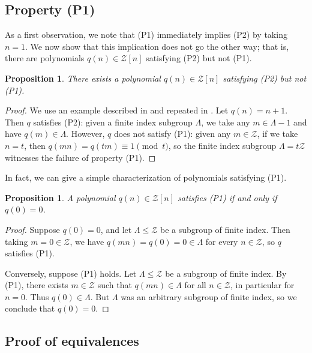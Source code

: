\documentclass[11pt]{amsart}
\theoremstyle{theorem}
\newtheorem{proposition}[theorem]{Proposition}
\theoremstyle{definition}
\newcommand{\mZ}{\mathcal{Z}}
\begin{document}
\subsection{Property (P1)}

As a first observation, we note that (P1) immediately implies (P2) by taking $n = 1$.
We now show that this implication does not go the other way; that is, there are polynomials $q(n) \in \mZ[n]$ satisfying (P2) but not (P1).

\begin{proposition} \label{prop: inequivalence}
	There exists a polynomial $q(n) \in \mZ[n]$ satisfying (P2) but not (P1).
\end{proposition}

\begin{proof}
	We use an example described in \cite[p. 3, footnote 3]{ab_fields} and repeated in \cite[Remark 4.15]{ab_rings}.
	Let $q(n) = n+1$.
	Then $q$ satisfies (P2): given a finite index subgroup $\Lambda$, we take any $m \in \Lambda - 1$ and have $q(m) \in \Lambda$.
	However, $q$ does not satisfy (P1): given any $m \in \mZ$, if we take $n = t$, then $q(mn) = q(tm) \equiv 1 \pmod{t}$, so the finite index subgroup $\Lambda = t\mZ$ witnesses the failure of property (P1).
\end{proof}

In fact, we can give a simple characterization of polynomials satisfying (P1).

\begin{proposition}
    A polynomial $q(n) \in \mZ[n]$ satisfies (P1) if and only if $q(0) = 0$.
\end{proposition}

\begin{proof}
    Suppose $q(0) = 0$, and let $\Lambda \le \mZ$ be a subgroup of finite index.
    Then taking $m = 0 \in \mZ$, we have $q(mn) = q(0) = 0 \in \Lambda$ for every $n \in \mZ$, so $q$ satisfies (P1).

    Conversely, suppose (P1) holds.
    Let $\Lambda \le \mZ$ be a subgroup of finite index.
    By (P1), there exists $m \in \mZ$ such that $q(mn) \in \Lambda$ for all $n \in \mZ$, in particular for $n = 0$.
    Thus $q(0) \in \Lambda$.
    But $\Lambda$ was an arbitrary subgroup of finite index, so we conclude that $q(0) = 0$.
\end{proof}

\subsection{Proof of equivalences}
\end{document}
